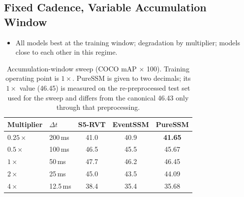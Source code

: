 \documentclass[11pt, a4paper]{report}
\begin{document}
\subsection{Fixed Cadence, Variable Accumulation Window}
\begin{itemize}
  \item All models best at the training window; degradation by multiplier; models close to each other in this regime.
\end{itemize}
\begin{table}[htbp]
\centering
\caption{Accumulation-window sweep (COCO mAP $\times$ 100). Training operating point is $1\times$.
PureSSM is given to two decimals; its $1\times$ value (46.45) is measured on the re-preprocessed test set
used for the sweep and differs from the canonical 46.43 only through that preprocessing.}
\label{tab:regime1}
\begin{tabular}{llccc}
\toprule
\textbf{Multiplier} & \textbf{$\Delta t$} & \textbf{S5-RVT} & \textbf{EventSSM} & \textbf{PureSSM} \\
\midrule
$0.25\times$ & 200\,ms & 41.0 & 40.9 & \textbf{41.65} \\
$0.5\times$  & 100\,ms & 46.5 & 45.5 & 45.67 \\
$1\times$    & 50\,ms  & 47.7 & 46.2 & 46.45 \\
$2\times$    & 25\,ms  & 45.0 & 43.5 & 44.09 \\
$4\times$    & 12.5\,ms & 38.4 & 35.4 & 35.68 \\
\bottomrule
\end{tabular}
\end{table}
\end{document}
